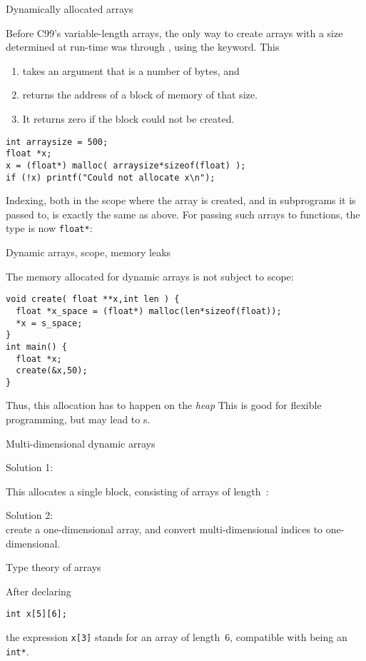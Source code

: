 {Dynamically allocated arrays}

Before C99's variable-length arrays,
the only way to create arrays with a size determined at run-time
was through ,
using the  keyword. This
\begin{enumerate}
\item takes an argument that is a number of bytes, and
\item returns the address of a block of memory of that size.
\item It returns zero if the block could not be created.
\end{enumerate}
\begin{lstlisting}
int arraysize = 500;
float *x;
x = (float*) malloc( arraysize*sizeof(float) );
if (!x) printf("Could not allocate x\n");
\end{lstlisting}

Indexing, both in the scope where the array is created,
and in subprograms it is passed to,
is exactly the same as above.
For passing such arrays to functions, the type is now \lstinline+float*+:
%

 {Dynamic arrays, scope, memory leaks}

The memory allocated for dynamic arrays is not subject to scope:
\begin{lstlisting}
void create( float **x,int len ) {
  float *x_space = (float*) malloc(len*sizeof(float));
  *x = s_space;
}
int main() {
  float *x;
  create(&x,50);
}
\end{lstlisting}
Thus, this allocation has to happen on the
\emph{heap}
This is good for flexible programming, but
may lead to s.

 {Multi-dimensional dynamic arrays}

Solution 1:

This allocates a single block,
consisting of arrays of length~:

Solution 2:\\
create a one-dimensional array,
and convert multi-dimensional indices to one-dimensional.


 {Type theory of arrays}

After declaring
\begin{lstlisting}
int x[5][6];
\end{lstlisting}
the expression \lstinline{x[3]} stands for an array of length~6,
compatible with being an \lstinline+int*+.

